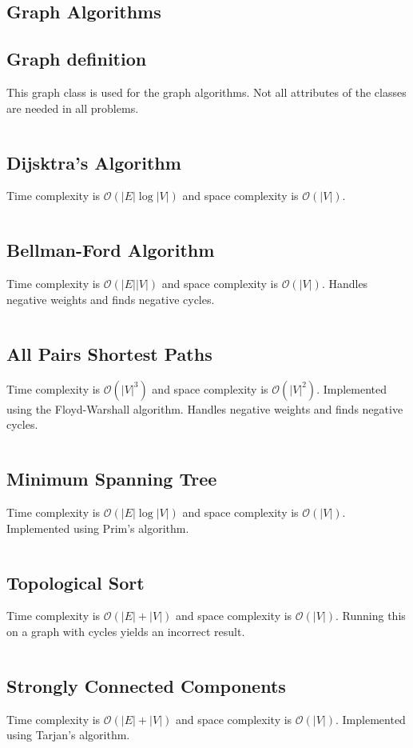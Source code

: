 \documentclass[8pt,a4paper,landscape,oneside]{amsart}
\newcommand{\code}[1]{\inputminted[fontsize=\normalsize,baselinestretch=1]{java}{code/#1}}
\newcommand{\bigO}{\mathcal{O}}
\begin{document}
\begin{multicols*}{3}
  
\section{Graph Algorithms}
  \subsection{Graph definition}
  This graph class is used for the graph algorithms. Not all attributes of the classes are needed in all problems.
  \code{Graphs/Graph.java}
  
  \subsection{Dijsktra's Algorithm}
  Time complexity is $\bigO(|E| \log{|V|})$ and space complexity is $\bigO(|V|)$.
  \code{Graphs/Dijkstras.java}
  
  \subsection{Bellman-Ford Algorithm}
  Time complexity is $\bigO(|E||V|)$ and space complexity is $\bigO(|V|)$. Handles negative weights and finds negative cycles.
  \code{Graphs/BellmanFord.java}
  
  \subsection{All Pairs Shortest Paths}
  Time complexity is $\bigO(|V|^3)$ and space complexity is $\bigO(|V|^2)$. Implemented using the Floyd-Warshall algorithm. Handles negative weights and finds negative cycles.
  \code{Graphs/FloydWarshall.java}
  
  \subsection{Minimum Spanning Tree}
  Time complexity is $\bigO(|E| \log{|V|})$ and space complexity is $\bigO(|V|)$. Implemented using Prim's algorithm.
  \code{Graphs/MST.java}
  
  \subsection{Topological Sort}
  Time complexity is $\bigO(|E| + |V|)$ and space complexity is $\bigO(|V|)$. Running this on a graph with cycles yields an incorrect result.
  \code{Graphs/TopologicalSort.java}
  
  \subsection{Strongly Connected Components}
  Time complexity is $\bigO(|E| + |V|)$ and space complexity is $\bigO(|V|)$. Implemented using Tarjan's algorithm.
  \code{Graphs/StronglyConnectedComponents.java}
  

\end{multicols*}
\end{document}
